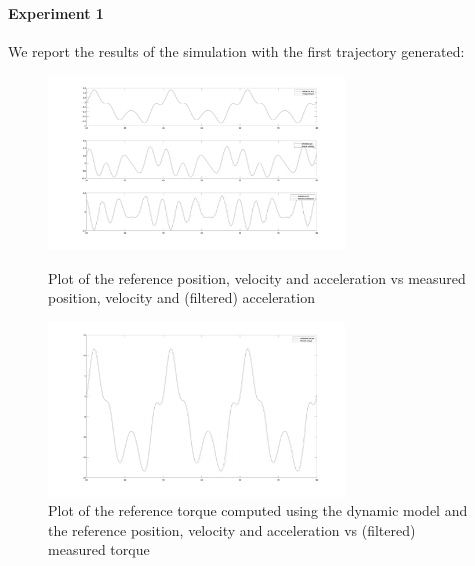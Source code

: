 \documentclass{article}
\begin{document}
\paragraph{Experiment 1}
We report the results of the simulation with the first trajectory generated:
\begin{figure}[!htbp]
\centering
\includegraphics[width=0.7\textwidth]{images/1-dof/experiment1_traj.png}
\caption{Plot of the reference position, velocity and acceleration vs measured position, velocity and (filtered) acceleration}
\includegraphics[width=0.7\textwidth]{images/1-dof/experiment1.png}
\caption{Plot of the reference torque computed using the dynamic model and the reference position, velocity and acceleration vs (filtered) measured torque}
\end{figure}
\pagebreak
\end{document}
